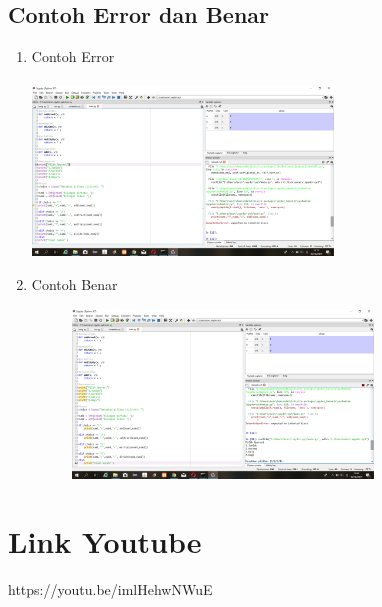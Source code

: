\documentclass{article}
\begin{document}
\subsection{Contoh Error dan Benar}
\begin{enumerate}
    \item Contoh Error
    \paragraph{}
        \centerline{\includegraphics[width=8cm]{image/error.png}}
    \item Contoh Benar
    \begin{figure}[h]
            \centerline{\includegraphics[width=8cm]{image/contohbenar.png}}
        \end{figure}
\end{enumerate}
\section{Link Youtube}
https://youtu.be/imlHehwNWuE
\end{document}
